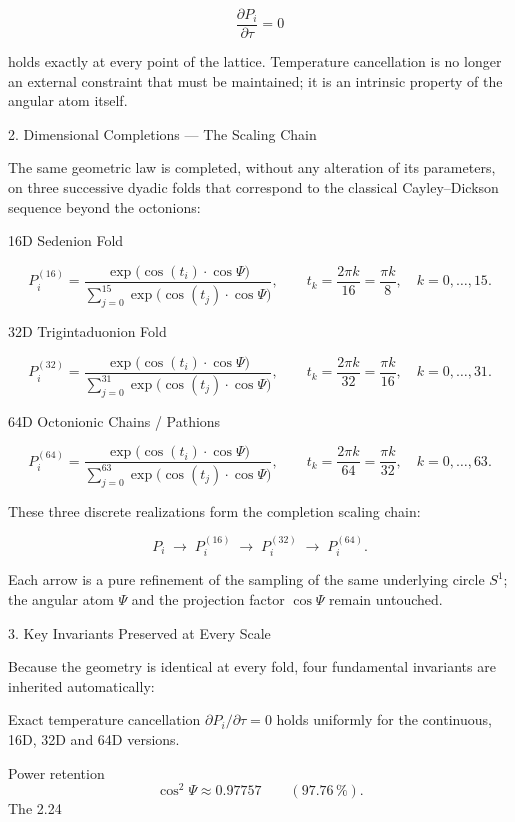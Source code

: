 \[
\frac{\partial P_i}{\partial\tau} = 0
\]

holds exactly at every point of the lattice. Temperature cancellation is no longer an external constraint that must be maintained; it is an intrinsic property of the angular atom itself.

2. Dimensional Completions — The Scaling Chain

The same geometric law is completed, without any alteration of its parameters, on three successive dyadic folds that correspond to the classical Cayley–Dickson sequence beyond the octonions:

16D Sedenion Fold

\[
P_i^{(16)} = \dfrac{\exp\bigl(\cos(t_i)\cdot\cos\Psi\bigr)}{\sum_{j=0}^{15}\exp\bigl(\cos(t_j)\cdot\cos\Psi\bigr)},
\qquad
t_k = \frac{2\pi k}{16} = \frac{\pi k}{8},\quad k=0,\dots,15.
\]

32D Trigintaduonion Fold

\[
P_i^{(32)} = \dfrac{\exp\bigl(\cos(t_i)\cdot\cos\Psi\bigr)}{\sum_{j=0}^{31}\exp\bigl(\cos(t_j)\cdot\cos\Psi\bigr)},
\qquad
t_k = \frac{2\pi k}{32} = \frac{\pi k}{16},\quad k=0,\dots,31.
\]

64D Octonionic Chains / Pathions

\[
P_i^{(64)} = \dfrac{\exp\bigl(\cos(t_i)\cdot\cos\Psi\bigr)}{\sum_{j=0}^{63}\exp\bigl(\cos(t_j)\cdot\cos\Psi\bigr)},
\qquad
t_k = \frac{2\pi k}{64} = \frac{\pi k}{32},\quad k=0,\dots,63.
\]

These three discrete realizations form the completion scaling chain:

\[
P_i \;\longrightarrow\; P_i^{(16)} \;\longrightarrow\; P_i^{(32)} \;\longrightarrow\; P_i^{(64)}.
\]

Each arrow is a pure refinement of the sampling of the same underlying circle \(S^1\); the angular atom \(\Psi\) and the projection factor \(\cos\Psi\) remain untouched.

3. Key Invariants Preserved at Every Scale

Because the geometry is identical at every fold, four fundamental invariants are inherited automatically:

Exact temperature cancellation 
   \(\partial P_i/\partial\tau = 0\) holds uniformly for the continuous, 16D, 32D and 64D versions.

Power retention 
   \[
   \cos^2\Psi \approx 0.97757 \qquad (97.76\,\%).
   \]
   The 2.24 %

